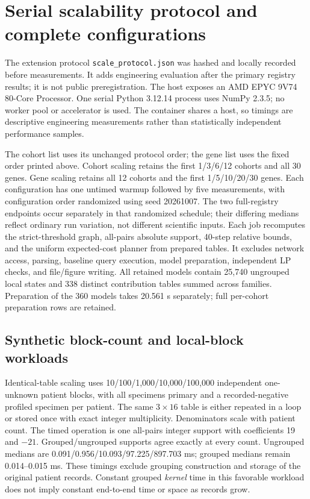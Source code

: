 \documentclass[10pt,letterpaper]{article}
\begin{document}
\section{Serial scalability protocol and complete configurations}
The extension protocol \texttt{scale\_protocol.json} was hashed and locally recorded before measurements. It adds engineering evaluation after the primary registry results; it is not public preregistration. The host exposes an AMD EPYC 9V74 80-Core Processor. One serial Python 3.12.14 process uses NumPy 2.3.5; no worker pool or accelerator is used. The container shares a host, so timings are descriptive engineering measurements rather than statistically independent performance samples.

The cohort list uses its unchanged protocol order; the gene list uses the fixed order printed above. Cohort scaling retains the first 1/3/6/12 cohorts and all 30 genes. Gene scaling retains all 12 cohorts and the first 1/5/10/20/30 genes. Each configuration has one untimed warmup followed by five measurements, with configuration order randomized using seed 20261007. The two full-registry endpoints occur separately in that randomized schedule; their differing medians reflect ordinary run variation, not different scientific inputs. Each job recomputes the strict-threshold graph, all-pairs absolute support, 40-step relative bounds, and the uniform expected-cost planner from prepared tables. It excludes network access, parsing, baseline query execution, model preparation, independent LP checks, and file/figure writing. All retained models contain 25,740 ungrouped local states and 338 distinct contribution tables summed across families. Preparation of the 360 models takes 20.561 s separately; full per-cohort preparation rows are retained.

\begin{center}\small\end{center}

\subsection{Synthetic block-count and local-block workloads}
Identical-table scaling uses 10/100/1,000/10,000/100,000 independent one-unknown patient blocks, with all specimens primary and a recorded-negative profiled specimen per patient. The same $3\times16$ table is either repeated in a loop or stored once with exact integer multiplicity. Denominators scale with patient count. The timed operation is one all-pairs integer support with coefficients 19 and $-21$. Grouped/ungrouped supports agree exactly at every count. Ungrouped medians are 0.091/0.956/10.093/97.225/897.703 ms; grouped medians remain 0.014--0.015 ms. These timings exclude grouping construction and storage of the original patient records. Constant grouped \emph{kernel} time in this favorable workload does not imply constant end-to-end time or space as records grow.
\end{document}
